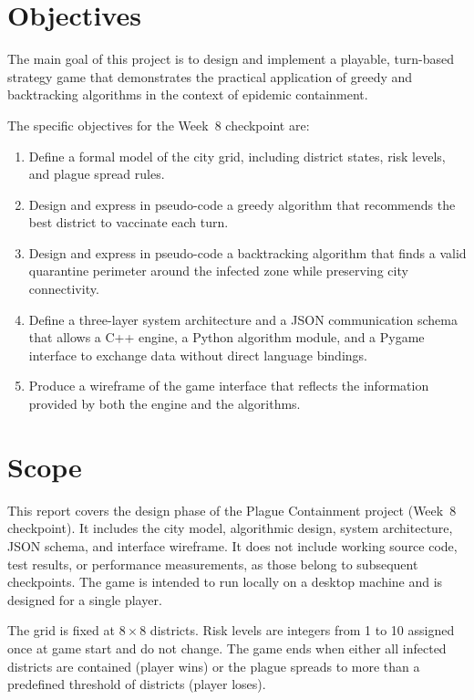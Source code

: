 \documentclass[12pt, a4paper]{article}
\begin{document}
\section{Objectives}

The main goal of this project is to design and implement a playable,
turn-based strategy game that demonstrates the practical application of
greedy and backtracking algorithms in the context of epidemic containment.

The specific objectives for the Week~8 checkpoint are:

\begin{enumerate}
  \item Define a formal model of the city grid, including district states,
        risk levels, and plague spread rules.
  \item Design and express in pseudo-code a greedy algorithm that
        recommends the best district to vaccinate each turn.
  \item Design and express in pseudo-code a backtracking algorithm that
        finds a valid quarantine perimeter around the infected zone while
        preserving city connectivity.
  \item Define a three-layer system architecture and a JSON communication
        schema that allows a C++ engine, a Python algorithm module, and a
        Pygame interface to exchange data without direct language bindings.
  \item Produce a wireframe of the game interface that reflects the
        information provided by both the engine and the algorithms.
\end{enumerate}

\section{Scope}

This report covers the design phase of the Plague Containment project
(Week~8 checkpoint). It includes the city model, algorithmic design,
system architecture, JSON schema, and interface wireframe. It does not
include working source code, test results, or performance measurements,
as those belong to subsequent checkpoints. The game is intended to run
locally on a desktop machine and is designed for a single player.

The grid is fixed at $8\times8$ districts. Risk levels are integers from
1 to 10 assigned once at game start and do not change. The game ends when
either all infected districts are contained (player wins) or the plague
spreads to more than a predefined threshold of districts (player loses).
\end{document}
